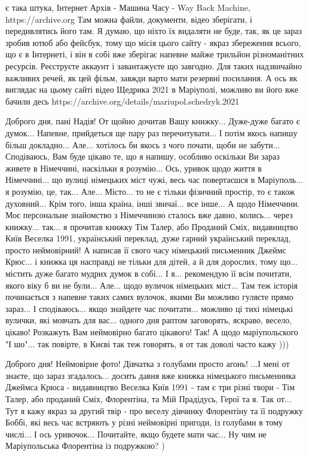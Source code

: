 є така штука, Інтернет Архів - Машина Часу - Way Back Machine,
https://archive.org Там можна файли, документи, відео зберігати, і
передивлятись його там. Я думаю, що ніхто їх видаляти не буде, так, як це зараз
зробив ютюб або фейсбук, тому що місія цього сайту - якраз збереження всього,
що є в Інтернеті, і він в собі вже зберігає напевне майже трильйон
різноманітних ресурсів. Реєструєте аккаунт і завантажуєте що завгодно. Для
таких надзвичайно важливих речей, як цей фільм, завжди варто мати резервні
посилання. А ось як виглядає на цьому сайті відео Щедрика 2021 в Маріуполі,
можливо ви його вже бачили десь
https://archive.org/details/mariupol.schedryk.2021

Доброго дня, пані Надія! От щойно дочитав Вашу книжку... Дуже-дуже багато є
думок... Напевне, прийдеться ще пару раз перечитувати... І потім якось напишу
більш докладно... Але... хотілось би якось з чого почати, щоби не забути...
Сподіваюсь, Вам буде цікаво те, що я напишу, особливо оскільки Ви зараз живете
в Німеччині, наскільки я розумію... Ось, уривок щодо життя в Німеччині... що
вулиці німецьких міст чужі, весь час повертаєшся в Маріуполь... я розумію, це,
так... Але... Місто... то не є тільки фізичний простір, то є також духовний...
Крім того, інша країна, інші звичаї... все інше... А щодо Німеччини. Моє
персональне знайомство з Німеччиною сталось вже давно, колись... через
книжку... так... я прочитав книжку Тім Талер, або Проданий Сміх, видавництво
Київ Веселка 1991, український переклад, дуже гарний український переклад,
просто неймовірний! А написав її свого часу німецький письменник Джеймс Крюс...
і книжка ця насправді не тільки для дітей, а й для дорослих, тому що... містить
дуже багато мудрих думок в собі... І я... рекомендую її всім почитати, якого
віку б ви не були... Але... щодо вуличок німецьких міст... Там теж історія
починається з напевне таких самих вулочок, якими Ви можливо гуляєте прямо
зараз... І сподіваюсь... якщо знайдете час почитати... можливо ці тихі німецькі
вулички, які мовчать для вас... одного дня раптом заговорять, яскраво, весело,
цікаво! Розкажуть Вам неймовірно багато цікавого! Так! А щодо маріупольского "І
шо"... так повірте, в Києві так теж говорять, я от так доволі часто кажу )))

Доброго дня! Неймовірне фото! Дівчатка з голубами просто агонь! ...І мені от
знаєте, що зараз згадалось... досить давня вже книжка німецького письменника
Джеймса Крюса - видавництво Веселка Київ 1991 - там є три різні твори - Тім
Талер, або проданий Сміх, Флорентіна, та Мій Прадідусь, Герої та я. Так от...
Тут я кажу якраз за другий твір - про веселу дівчинку Флорентіну та її подружку
Боббі, які весь час встряють у різні неймовірні пригоди, із голубами в тому
числі... І ось уривочок... Почитайте, якщо будете мати час... Ну чим не
Маріупольська Флорентіна із подружкою? )

